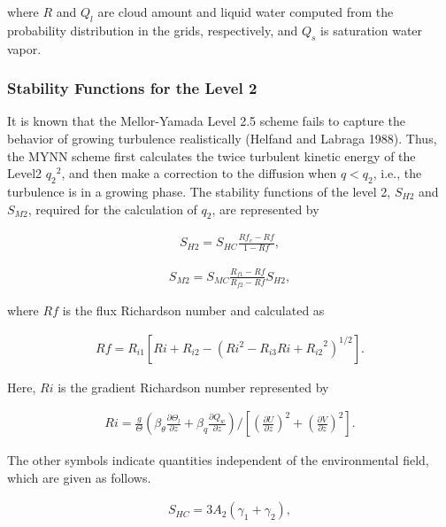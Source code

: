 where \(R\) and \(Q_l\) are cloud amount and liquid water computed from
the probability distribution in the grids, respectively, and \(Q_s\) is
saturation water vapor.

\hypertarget{stability-functions-for-the-level-2}{%
\subsubsection{Stability Functions for the Level
2}\label{stability-functions-for-the-level-2}}

It is known that the Mellor-Yamada Level 2.5 scheme fails to capture the
behavior of growing turbulence realistically (Helfand and Labraga 1988).
Thus, the MYNN scheme first calculates the twice turbulent kinetic
energy of the Level2 \({q_2}^2\), and then make a correction to the
diffusion when \(q<q_2\), i.e., the turbulence is in a growing phase.
The stability functions of the level 2, \(S_{H2}\) and \(S_{M2}\),
required for the calculation of \(q_2\), are represented by

\begin{eqnarray}S_{H2}=S_{HC}\frac{Rf_c-Rf}{1-Rf},\end{eqnarray}

\begin{eqnarray}S_{M2}=S_{MC}\frac{R_{f1}-Rf}{R_{f2}-Rf}S_{H2},\end{eqnarray}

where \(Rf\) is the flux Richardson number and calculated as

\begin{eqnarray}Rf=R_{i1}\left[Ri+R_{i2}-(Ri^2-R_{i3}Ri+{R_{i2}}^2)^{1/2}\right].\end{eqnarray}

Here, \(Ri\) is the gradient Richardson number represented by

\begin{eqnarray}Ri=\frac{g}{\Theta}\left(\beta_\theta \frac{\partial \Theta_l}{\partial z}+\beta_q \frac{\partial Q_w}{\partial z}\right) \Bigg/ \left[ \left(\frac{\partial U}{\partial z}\right)^2+\left(\frac{\partial V}{\partial z}\right)^2 \right].\end{eqnarray}

The other symbols indicate quantities independent of the environmental
field, which are given as follows.

\begin{eqnarray}S_{HC}=3A_2(\gamma_1+\gamma_2),\end{eqnarray}

